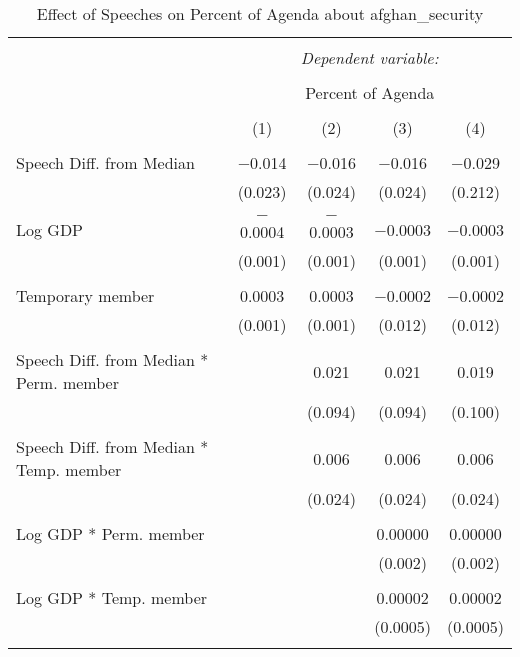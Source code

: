 
\begin{table}[!htbp] \centering 
  \caption{Effect of Speeches on Percent of Agenda about afghan_security} 
  \label{} 
\begin{tabular}{@{\extracolsep{5pt}}lcccc} 
\\[-1.8ex]\hline 
\hline \\[-1.8ex] 
 & \multicolumn{4}{c}{\textit{Dependent variable:}} \\ 
\cline{2-5} 
\\[-1.8ex] & \multicolumn{4}{c}{Percent of Agenda} \\ 
\\[-1.8ex] & (1) & (2) & (3) & (4)\\ 
\hline \\[-1.8ex] 
 Speech Diff. from Median & $-$0.014 & $-$0.016 & $-$0.016 & $-$0.029 \\ 
  & (0.023) & (0.024) & (0.024) & (0.212) \\ 
  & & & & \\ 
 Log GDP & $-$0.0004 & $-$0.0003 & $-$0.0003 & $-$0.0003 \\ 
  & (0.001) & (0.001) & (0.001) & (0.001) \\ 
  & & & & \\ 
 Temporary member & 0.0003 & 0.0003 & $-$0.0002 & $-$0.0002 \\ 
  & (0.001) & (0.001) & (0.012) & (0.012) \\ 
  & & & & \\ 
 Speech Diff. from Median * Perm. member &  & 0.021 & 0.021 & 0.019 \\ 
  &  & (0.094) & (0.094) & (0.100) \\ 
  & & & & \\ 
 Speech Diff. from Median * Temp. member &  & 0.006 & 0.006 & 0.006 \\ 
  &  & (0.024) & (0.024) & (0.024) \\ 
  & & & & \\ 
 Log GDP * Perm. member &  &  & 0.00000 & 0.00000 \\ 
  &  &  & (0.002) & (0.002) \\ 
  & & & & \\ 
 Log GDP * Temp. member &  &  & 0.00002 & 0.00002 \\ 
  &  &  & (0.0005) & (0.0005) \\ 
  & & & & \\ 

\end{tabular}
\end{table}
